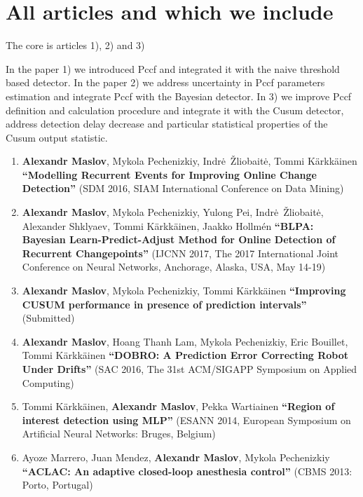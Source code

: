 \chapter{All articles and which we include}

The core is articles 1), 2) and 3)

In the paper 1) we introduced Pccf and integrated it with the naive threshold based detector.
In the paper 2) we address uncertainty in Pccf parameters estimation and integrate Pccf with the Bayesian detector.
In 3) we improve Pccf definition and calculation procedure and integrate it with the Cusum detector, address detection delay decrease and particular statistical properties of the Cusum output statistic.

\begin{enumerate}[leftmargin=0.2cm]

  \item \textbf{Alexandr Maslov}, Mykola Pechenizkiy, Indr\.e~\v{Z}liobait\.e, Tommi K\"{a}rkk\"{a}inen \textbf{``Modelling Recurrent Events for Improving Online Change Detection''} (SDM 2016, SIAM International Conference on Data Mining)

  \item \textbf{Alexandr Maslov}, Mykola Pechenizkiy, Yulong Pei, Indr\.e~\v{Z}liobait\.e, Alexander Shklyaev, Tommi K\"{a}rkk\"{a}inen, Jaakko Hollm{\'e}n \textbf{``BLPA: Bayesian Learn-Predict-Adjust Method for Online  Detection of Recurrent Changepoints''} (IJCNN 2017, The 2017 International Joint Conference on Neural Networks, Anchorage, Alaska, USA, May 14-19)

  \item \textbf{Alexandr Maslov}, Mykola Pechenizkiy, Tommi K\"{a}rkk\"{a}inen \textbf{``Improving CUSUM performance in presence of prediction intervals''} (Submitted)

  \item \textbf{Alexandr Maslov}, Hoang Thanh Lam, Mykola Pechenizkiy, Eric Bouillet, Tommi K\"{a}rkk\"{a}inen \textbf{``DOBRO: A Prediction Error Correcting Robot Under Drifts''} (SAC 2016, The 31st ACM/SIGAPP Symposium on Applied Computing)

  \item Tommi K\"{a}rkk\"{a}inen, \textbf{Alexandr Maslov}, Pekka Wartiainen
\textbf{``Region of interest detection using MLP''} (ESANN 2014, European Symposium on Artificial Neural Networks: Bruges, Belgium)

  \item Ayoze Marrero, Juan Mendez, \textbf{Alexandr Maslov}, Mykola Pechenizkiy \textbf{``ACLAC: An adaptive closed-loop anesthesia control''} (CBMS 2013: Porto, Portugal)


\end{enumerate}
